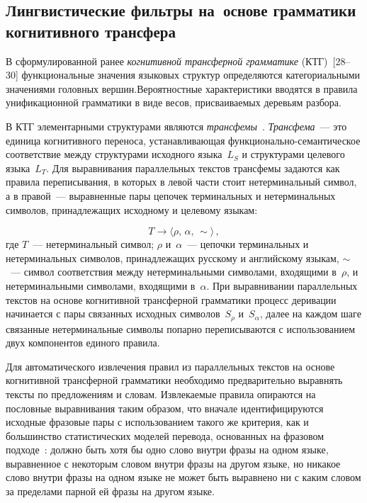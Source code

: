 \begin{multicols}{2}
\section{Лингвистические фильтры на~основе грамматики 
когнитивного трансфера}

     В сформулированной ранее \textit{когнитивной трансферной 
грамматике} (КТГ)~[28--30] %
функциональные значения 
языковых структур определяются категориальными значениями головных 
вершин.\linebreak Вероятностные характеристики вводятся в правила унификационной 
грамматики в виде весов, присваиваемых деревьям разбора. 
     
     В КТГ элементарными структурами являются 
\textit{трансфемы}~\cite{30koz}. \textit{Трансфема}~--- это едини\-ца 
когнитивного переноса, устанавливающая функ\-ци\-о\-наль\-но-семантическое 
соответствие между структурами исходного языка~$L_S$ и структурами 
целевого языка~$L_T$. Для выравнивания параллельных текстов трансфемы 
задаются как правила переписывания, в которых в левой части стоит 
нетерминальный символ, а в правой~--- выравненные пары цепочек 
терминальных и нетерминальных символов, принадлежащих исходному и 
целевому языкам:
\pagebreak

\noindent
     \begin{equation*}
     T\rightarrow \langle\rho,\,\alpha,\,\sim\rangle\,,
     \end{equation*}
где $T$~--- нетерминальный символ; $\rho$ и~$\alpha$~--- цепочки 
терминальных и нетерминальных символов, принадлежащих русскому и 
английскому языкам, $\sim$~--- символ соответствия между 
нетерминальными символами, входящими в~$\rho$, и нетерминальными 
символами, входящими в~$\alpha$. При выравнивании параллельных текстов 
на основе когнитивной трансферной грамматики процесс деривации 
начинается с пары связанных исходных символов~$S_\rho$ и~$S_\alpha$, 
далее на каждом шаге связанные нетерминальные символы попарно 
переписываются с использованием двух компонентов единого правила. 
     
     Для автоматического извлечения правил из па\-раллельных текстов на 
основе когнитивной трансферной грамматики необходимо предварительно\linebreak 
выравнять тексты по предложениям и словам. Извле\-каемые правила 
опираются на пословные выравнивания таким образом, что вначале 
идентифицируются исходные фразовые пары с использованием такого же 
критерия, как и большинство статистических моделей перевода, основанных 
на фразовом подходе~\cite{19koz}: должно быть хотя бы одно 
слово внутри фразы на одном языке, выравненное с некоторым словом 
внутри фразы на другом языке, но никакое слово внутри фразы на одном 
языке не может быть выравнено ни с каким словом за пределами парной ей 
фразы на другом языке.
{ %

}
\end{multicols}
